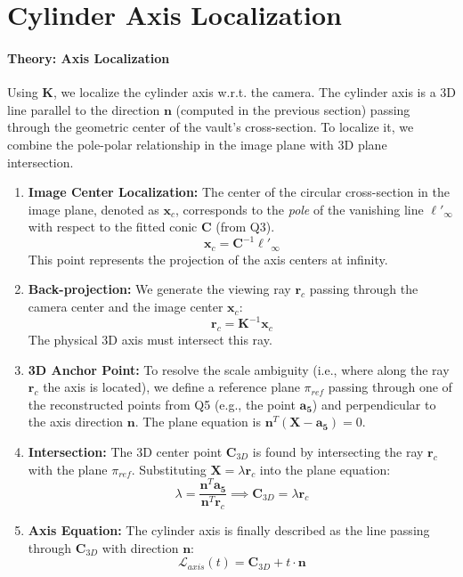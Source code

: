 \documentclass[a4paper,11pt]{article}
\newcommand{\matr}[1]{\bm{#1}}     %
\newcommand{\vect}[1]{\mathbf{#1}}  %
\begin{document}
\section{Cylinder Axis Localization}

\paragraph{Theory: Axis Localization}
Using $\matr{K}$, we localize the cylinder axis w.r.t. the camera. The cylinder axis is a 3D line parallel to the direction $\vect{n}$ (computed in the previous section) passing through the geometric center of the vault's cross-section.
To localize it, we combine the pole-polar relationship in the image plane with 3D plane intersection.

\begin{enumerate}
    \item \textbf{Image Center Localization:} The center of the circular cross-section in the image plane, denoted as $\vect{x}_c$, corresponds to the \textit{pole} of the vanishing line $\ell'_\infty$ with respect to the fitted conic $\matr{C}$ (from Q3). 
    \begin{equation}
        \vect{x}_c = \matr{C}^{-1} \ell'_\infty
    \end{equation}
    This point represents the projection of the axis centers at infinity.
    
    \item \textbf{Back-projection:} We generate the viewing ray $\vect{r}_c$ passing through the camera center and the image center $\vect{x}_c$:
    \begin{equation}
        \vect{r}_c = \matr{K}^{-1} \vect{x}_c
    \end{equation}
    The physical 3D axis must intersect this ray.
    
    \item \textbf{3D Anchor Point:} To resolve the scale ambiguity (i.e., where along the ray $\vect{r}_c$ the axis is located), we define a reference plane $\pi_{ref}$ passing through one of the reconstructed points from Q5 (e.g., the point $\vect{a_5}$) and perpendicular to the axis direction $\vect{n}$. The plane equation is $\vect{n}^T (\vect{X} - \vect{a_5}) = 0$.
    
    \item \textbf{Intersection:} The 3D center point $\vect{C}_{3D}$ is found by intersecting the ray $\vect{r}_c$ with the plane $\pi_{ref}$. Substituting $\vect{X} = \lambda \vect{r}_c$ into the plane equation:
    \begin{equation}
        \lambda = \frac{\vect{n}^T \vect{a_5}}{\vect{n}^T \vect{r}_c} \implies \vect{C}_{3D} = \lambda \vect{r}_c
    \end{equation}
    
    \item \textbf{Axis Equation:} The cylinder axis is finally described as the line passing through $\vect{C}_{3D}$ with direction $\vect{n}$:
    \begin{equation}
        \mathcal{L}_{axis}(t) = \vect{C}_{3D} + t \cdot \vect{n}
    \end{equation}
\end{enumerate}
\end{document}

